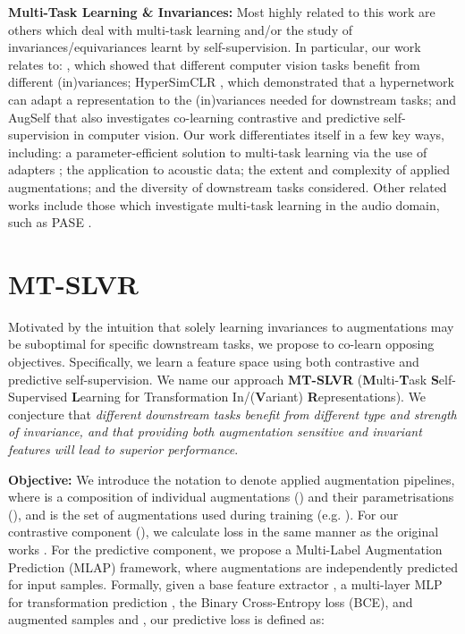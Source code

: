 \documentclass{INTERSPEECH2023}
\begin{document}
\noindent \textbf{Multi-Task Learning \& Invariances:}
Most highly related to this work are others which deal with multi-task learning and/or the study of invariances/equivariances learnt by self-supervision. In particular, our work relates to: \cite{linus_invariance}, which showed that different computer vision tasks benefit from different (in)variances; HyperSimCLR \cite{hyper_simclr}, which demonstrated that a hypernetwork can adapt a representation to the (in)variances needed for downstream tasks; and AugSelf \cite{aug_self} that also investigates co-learning contrastive and predictive self-supervision in computer vision. Our work differentiates itself in a few key ways, including: a parameter-efficient solution to multi-task learning via the use of adapters \cite{residual_adapters}; the application to acoustic data; the extent and complexity of applied augmentations; and the diversity of downstream tasks considered. Other related works include those which investigate multi-task learning in the audio domain, such as PASE \cite{pase}.

\section{MT-SLVR}
Motivated by the intuition that solely learning invariances to augmentations may be suboptimal for specific downstream tasks, we propose to co-learn opposing objectives. Specifically, we learn a feature space using both contrastive and predictive self-supervision. We name our approach \textbf{MT-SLVR} (\textbf{M}ulti-\textbf{T}ask \textbf{S}elf-Supervised \textbf{L}earning for Transformation In/(\textbf{V}ariant) \textbf{R}epresentations). 
We conjecture that \emph{different downstream tasks benefit from different type and strength of invariance, and that providing both augmentation sensitive and invariant features will lead to superior performance}.

\noindent\textbf{Objective:} We introduce the notation  to denote applied augmentation pipelines, where  is a composition of individual augmentations () and their parametrisations (), and  is the set of augmentations used during training (e.g. ). For our contrastive component (), we calculate loss in the same manner as the original works \cite{simclr,simsiam}. For the predictive component, we propose a Multi-Label Augmentation Prediction (MLAP) framework, where augmentations are independently predicted for input samples. Formally, given a base feature extractor , a multi-layer MLP for transformation prediction , the Binary Cross-Entropy loss (BCE), and augmented samples  and , our predictive loss is defined as:
\end{document}
